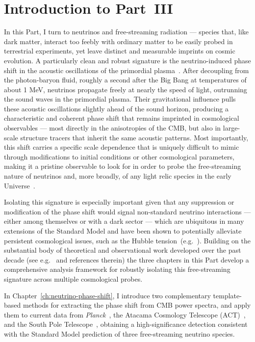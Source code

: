 \chapter*{Introduction to Part~III}
\label{ch:part3-intro}

In this Part, I turn to neutrinos and free-streaming radiation --- species that, like dark matter, interact too feebly with ordinary matter to be easily probed in terrestrial experiments, yet leave distinct and measurable imprints on cosmic evolution. A particularly clean and robust signature is the neutrino-induced phase shift in the acoustic oscillations of the primordial plasma~\cite{Bashinsky:2003tk}. After decoupling from the photon-baryon fluid, roughly a second after the Big Bang at temperatures of about 1 MeV, neutrinos propagate freely at nearly the speed of light, outrunning the sound waves in the primordial plasma. Their gravitational influence pulls these acoustic oscillations slightly ahead of the sound horizon, producing a characteristic and coherent phase shift that remains imprinted in cosmological observables --- most directly in the anisotropies of the CMB, but also in large-scale structure tracers that inherit the same acoustic patterns.  Most importantly, this shift carries a specific scale dependence that is uniquely difficult to mimic through modifications to initial conditions or other cosmological parameters, making it a pristine observable to look for in order to probe the free-streaming nature of neutrinos and, more broadly, of any light relic species in the early Universe~\cite{Baumann:2015rya}.

Isolating this signature is especially important given that any suppression or modification of the phase shift would signal non-standard neutrino interactions --- either among themselves or with a dark sector --- which are ubiquitous in many extensions of the Standard Model and have been shown to potentially alleviate persistent cosmological issues, such as the Hubble tension~(e.g.~\cite{Ghosh:2019tab}). Building on the substantial body of theoretical and observational work developed over the past decade (see e.g.~\cite{Wallisch:2018rzj, Montefalcone:2025ibh} and references therein) the three chapters in this Part develop a comprehensive analysis framework for robustly isolating this free-streaming signature across multiple cosmological probes.

In Chapter~\ref{ch:neutrino-phase-shift}, I introduce two complementary template-based methods for extracting the phase shift from CMB power spectra, and apply them to current data from \textit{Planck}~\cite{planck18}, the Atacama Cosmology Telescope (ACT)~\cite{ACT:2025fju}, and the South Pole Telescope~\cite{SPT-3G:2025bzu}, obtaining a high-significance detection consistent with the Standard Model prediction of three free-streaming neutrino species.

